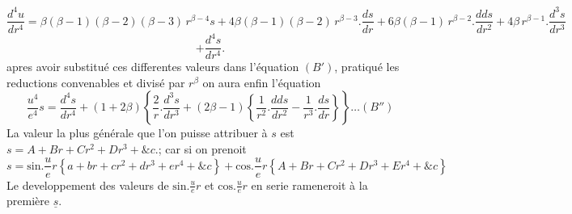 \documentclass[11pt,a4paper]{article}
\begin{document}

\[ \frac{d^4u}{dr^4} = \beta(\beta-1)(\beta-2)(\beta-3)\,r^{\beta-4}s + 4\beta(\beta-1)(\beta-2)\,r^{\beta-3}.\frac{ds}{dr} + 6\beta(\beta-1)\,r^{\beta-2}.\frac{dds}{dr^2} + 4\beta\,r^{\beta-1}.\frac{d^3s}{dr^3} \]
\[ + \frac{d^4s}{dr^4}. \]
 apres avoir substitué ces differentes valeurs dans l'équation
$(B')$,    pratiqué les reductions convenables 
 et divisé par $r^\beta$ on aura enfin
l'équation
\[ \frac{u^4}{e^4}s = \frac{d^4s}{dr^4} + (1+2\beta)\left\{\frac{2}{r}.\frac{d^3s}{dr^3} + (2\beta-1)\left\{\frac{1}{r^2}.\frac{dds}{dr^2} - \frac{1}{r^3}.\frac{ds}{dr}\right\}\right\} \ldots (B'') \]
La valeur la plus générale que l'on puisse attribuer à $s$ est
$s = A + Br + Cr^2 + Dr^3 + \&c.$; car si on  prenoit
\[ s = \text{sin}.\frac{u}{e}r\left\{a + br + cr^2 + dr^3 + er^4 + \&c\right\} + \text{cos}.\frac{u}{e}r\left\{A + Br + Cr^2 + Dr^3 + Er^4 + \&c\right\} \]
Le developpement des valeurs de $\text{sin}.\frac{u}{e}r$ et $\text{cos}.\frac{u}{e}r$ en serie
rameneroit à la première    $\underline{s}$.
\end{document}
